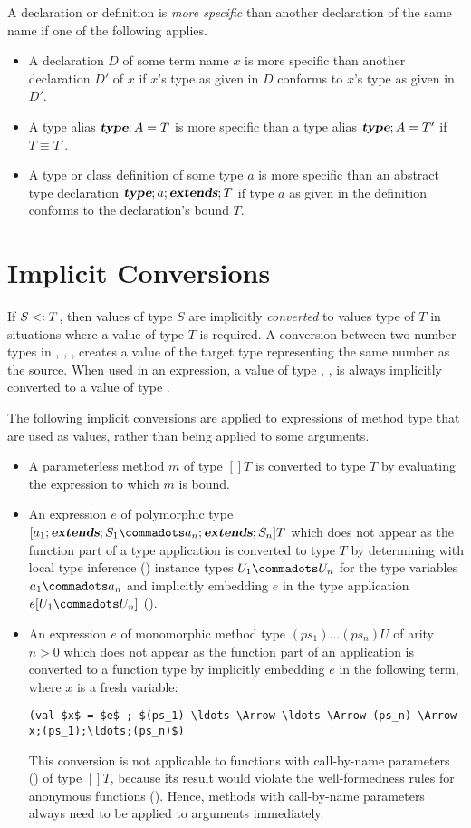 \documentclass[11pt]{report}
\begin{document}
A declaration or definition is {\em more specific} than another
declaration of the same name if one of the following applies.
\begin{itemize}
\item
A declaration $D$ of some term name $x$ is more specific
than another declaration $D'$ of $x$ if $x$'s type as given in
$D$ conforms to $x$'s type as given in $D'$.
\item
A type alias
$\mbox{\sl\bfseries type};A=T$ is more specific than a type alias $\mbox{\sl\bfseries type};A=T'$ if
$T \equiv T'$.
\item
A type or class definition of some type $a$ is more specific than an abstract
type declaration $\mbox{\sl\bfseries type};a ;\mbox{\sl\bfseries extends}; T$ if type $a$ as given in the
definition conforms to the declaration's bound $T$.
\end{itemize}

\section{Implicit Conversions}
\label{sec:impl-conv}

If $S <: T$, then values of type $S$ are implicitly {\em
converted} to values type of $T$ in situations where a value of type
$T$ is required. A conversion between two number types in \verb@Int@,
\verb@Long@, \verb@Float@, \verb@Double@ creates a value of the target
type representing the same number as the source.  When used in an
expression, a value of type \verb@Byte@, \verb@Char@, \verb@Short@ is
always implicitly converted to a value of type \verb@Int@.

The following implicit conversions are applied to expressions of
method type that are used as values, rather than being applied to some
arguments.
\begin{itemize}
\item
A parameterless method $m$ of type $[] T$
is converted to type $T$ by evaluating the expression to which $m$ is bound.
\item
An expression $e$ of polymorphic type $[a_1 \extends S_1 \commadots
a_n \extends S_n]T$ which does not appear as the function part of
a type application is converted to type $T$
by determining with local type inference
() instance types $U_1
\commadots U_n$ for the type variables $a_1 \commadots a_n$ and
implicitly embedding $e$ in the type application
$e[U_1 \commadots U_n]$ ().
\item
An expression $e$ of monomorphic method type
$(ps_1) \ldots (ps_n) U$ of arity $n > 0$
which does not appear as the function part of an application is
converted to a function type by implicitly embedding $e$ in
the following term, where $x$ is a fresh variable:
\begin{verbatim}
(val $x$ = $e$ ; $(ps_1) \ldots \Arrow \ldots \Arrow (ps_n) \Arrow x;(ps_1);\ldots;(ps_n)$)
\end{verbatim}
This conversion is not applicable to functions with call-by-name
parameters () of type $[]T$, because its result
would violate the well-formedness rules for anonymous functions
(). Hence, methods with call-by-name
parameters always need to be applied to arguments immediately.
\end{itemize}
\end{document}
